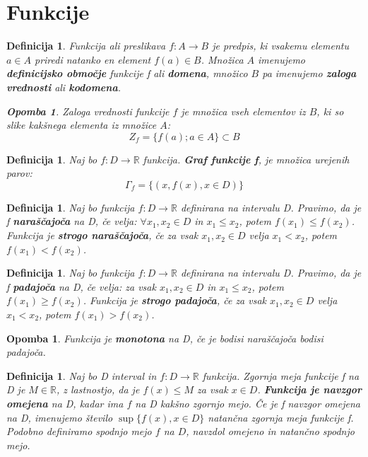 \documentclass[11pt]{article}
\newtheorem{Definicija}[Izrek]{{\sc Definicija}}
\newtheorem{Opomba}[Izrek]{{\sc Opomba}}
\begin{document}
\section{Funkcije}
\begin{Definicija}
	Funkcija ali preslikava $f: A \to B$ je predpis, ki vsakemu elementu $a \in A$ priredi natanko en element $f(a) \in B$. Množica $A$ imenujemo \textbf{definicijsko območje} funkcije f ali \textbf{domena}, množico $B$ pa imenujemo \textbf{zaloga vrednosti} ali \textbf{kodomena}.
\begin{Opomba}
	Zaloga vrednosti funkcije $f$ je množica vseh elementov iz $B$, ki so slike kakšnega elementa iz množice $A$:
	$$ Z_f = \{f(a); a\in A \} \subset B$$
\end{Opomba}
\end{Definicija}
\begin{Definicija}
	Naj bo $f: D \to \mathbb{R}$ funkcija.\textbf{ Graf funkcije f}, je množica urejenih parov:
	$$\Gamma_f = \{(x,f(x), x\in D)\}$$
\end{Definicija}
\begin{Definicija}
	Naj bo funkcija $f: D\to \mathbb{R}$ definirana na intervalu D. Pravimo, da je f \textbf{naraščajoča} na D, če velja: $ \forall x_1, x_2 \in D$ in $x_1 \le x_2$, potem \newline $f(x_1) \le f(x_2)$.
	\newline
	Funkcija je \textbf{strogo naraščajoča}, če za vsak $x_1, x_2 \in D$ velja $x_1 < x_2$, potem $f(x_1) < f(x_2)$.
\end{Definicija}
\begin{Definicija}
	Naj bo funkcija $f: D\to \mathbb{R}$ definirana na intervalu D. Pravimo, da je f \textbf{padajoča} na D, če velja: za vsak $x_1, x_2 \in D$ in $x_1 \le x_2$, potem \newline $f(x_1) \ge f(x_2)$.
	\newline
	Funkcija je \textbf{strogo padajoča}, če za vsak $x_1, x_2 \in D$ velja $x_1 < x_2$, potem $f(x_1) > f(x_2)$.
\end{Definicija}
\begin{Opomba}
	Funkcija je \textbf{monotona} na D, če je bodisi naraščajoča bodisi padajoča.
\end{Opomba}
\begin{Definicija}
	Naj  bo D interval in $f: D \to \mathbb{R}$ funkcija. Zgornja meja funkcije f na D je $M\in \mathbb{R}$, z lastnostjo, da je $f(x) \le M$ za vsak $x \in D$.
	\textbf{Funkcija je navzgor omejena} na D, kadar ima $f$ na D kakšno zgornjo mejo.
	Če je f navzgor omejena na D, imenujemo število $\sup\{f(x),x\in D\}$ natančna zgornja meja funkcije f.
	\newline
	Podobno definiramo spodnjo mejo $f$ na $D$, navzdol omejeno in natančno spodnjo mejo.
\end{Definicija}
\end{document}
